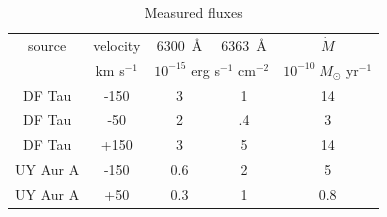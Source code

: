 \documentclass[twocolumn,trackchanges]{aastex62}
\begin{document}
\begin{table}
\caption{Measured fluxes\label{tab:flux}}
\begin{center}
\begin{tabular}{ccccc}
\hline\hline
source & velocity & 6300~\AA{} & 6363~\AA{} & $\dot M$\\ 
       & km s$^{-1}$ & \multicolumn{2}{c}{$10^{-15}$ erg s$^{-1}$ cm$^{-2}$} &
$10^{-10}\;M_{\odot}$ yr$^{-1}$\\
\hline
DF Tau & -150 & 3 & 1 &  14\\
DF Tau & -50 & 2 & .4 & 3\\
DF Tau & +150 & 3 & 5 & 14\\
UY Aur A & -150 & 0.6 & 2 & 5\\
UY Aur A & +50 & 0.3 & 1 & 0.8\\
\end{tabular}
\end{center}
\end{table}
\end{document}
